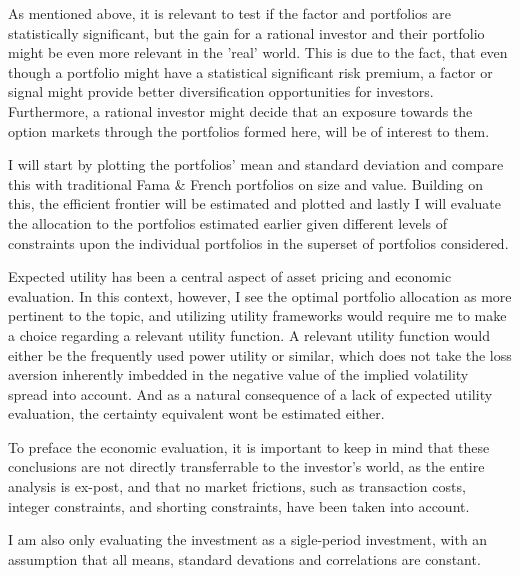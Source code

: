 As mentioned above, it is relevant to test if the factor and portfolios are statistically significant, but the gain for a rational investor and their portfolio might be even more relevant in the 'real' world. This is due to the fact, that even though a portfolio might have a statistical significant risk premium, a factor or signal might provide better diversification opportunities for investors. Furthermore, a rational investor might decide that an exposure towards the option markets through the portfolios formed here, will be of interest to them. 

I will start by plotting the portfolios' mean and standard deviation and compare this with traditional Fama \& French portfolios on size and value. Building on this, the efficient frontier will be estimated and plotted and lastly I will evaluate the allocation to the portfolios estimated earlier given different levels of constraints upon the individual portfolios in the superset of portfolios considered.

Expected utility has been a central aspect of asset pricing and economic evaluation. In this context, however, I see the optimal portfolio allocation as more pertinent to the topic, and utilizing utility frameworks would require me to make a choice regarding a relevant utility function. A relevant utility function would either be the frequently used power utility or similar, which does not take the loss aversion inherently imbedded in the negative value of the implied volatility spread into account. And as a natural consequence of a lack of expected utility evaluation, the certainty equivalent wont be estimated either. 

To preface the economic evaluation, it is important to keep in mind that these conclusions are not directly transferrable to the investor's world, as the entire analysis is ex-post, and that no market frictions, such as transaction costs, integer constraints, and shorting constraints,  have been taken into account. 

I am also only evaluating the investment as a sigle-period investment, with an assumption that all means, standard devations and correlations are constant.




